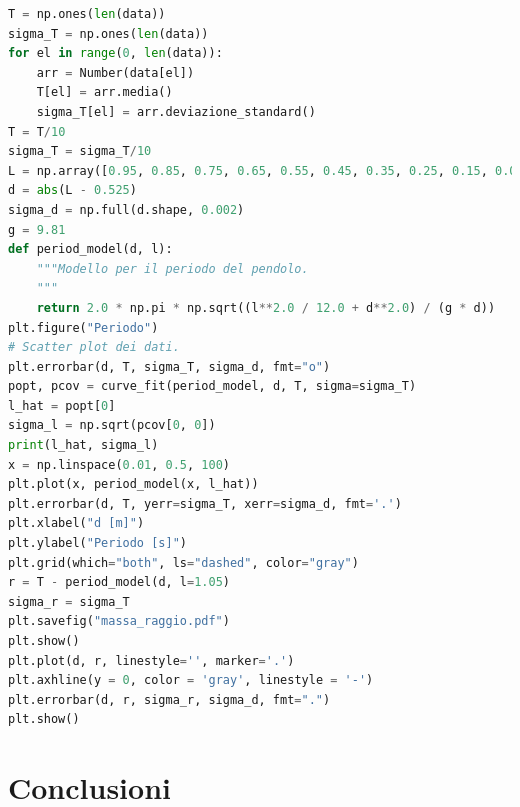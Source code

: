 \documentclass{article}
\begin{document}
\begin{minipage}{0.5\textwidth}
	\begin{lstlisting}[language=Python, firstnumber=24]
T = np.ones(len(data))
sigma_T = np.ones(len(data))
for el in range(0, len(data)):
    arr = Number(data[el])
    T[el] = arr.media()
    sigma_T[el] = arr.deviazione_standard()
T = T/10
sigma_T = sigma_T/10
L = np.array([0.95, 0.85, 0.75, 0.65, 0.55, 0.45, 0.35, 0.25, 0.15, 0.05])
d = abs(L - 0.525)
sigma_d = np.full(d.shape, 0.002) 
g = 9.81 
def period_model(d, l): 
    """Modello per il periodo del pendolo. 
    """ 
    return 2.0 * np.pi * np.sqrt((l**2.0 / 12.0 + d**2.0) / (g * d)) 
plt.figure("Periodo")
# Scatter plot dei dati. 
plt.errorbar(d, T, sigma_T, sigma_d, fmt="o")  
popt, pcov = curve_fit(period_model, d, T, sigma=sigma_T) 
l_hat = popt[0] 
sigma_l = np.sqrt(pcov[0, 0]) 
print(l_hat, sigma_l) 
x = np.linspace(0.01, 0.5, 100) 
plt.plot(x, period_model(x, l_hat))
plt.errorbar(d, T, yerr=sigma_T, xerr=sigma_d, fmt='.') 
plt.xlabel("d [m]") 
plt.ylabel("Periodo [s]")
plt.grid(which="both", ls="dashed", color="gray")
r = T - period_model(d, l=1.05)
sigma_r = sigma_T
plt.savefig("massa_raggio.pdf") 
plt.show()
plt.plot(d, r, linestyle='', marker='.')
plt.axhline(y = 0, color = 'gray', linestyle = '-') 
plt.errorbar(d, r, sigma_r, sigma_d, fmt=".")
plt.show()
	\end{lstlisting}
\end{minipage}
\newpage
\section{Conclusioni}
\end{document}
